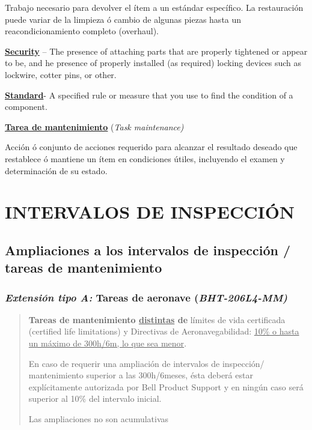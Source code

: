 \documentclass[
]{article}
\begin{document}
Trabajo necesario para devolver el ítem a un estándar específico. La
restauración puede variar de la limpieza ó cambio de algunas piezas
hasta un reacondicionamiento completo (overhaul).

\textbf{\ul{Security}} -- The presence of attaching parts that are
properly tightened or appear to be, and he presence of properly
installed (as required) locking devices such as lockwire, cotter pins,
or other.

\textbf{\ul{Standard}}- A specified rule or measure that you use to find
the condition of a component.

\textbf{\ul{Tarea de mantenimiento}} (\emph{Task maintenance)}

Acción ó conjunto de acciones requerido para alcanzar el resultado
deseado que restablece ó mantiene un ítem en condiciones útiles,
incluyendo el examen y determinación de su estado.
\newpage

\hypertarget{intervalos-de-inspecciuxf3n}{%
\section{\texorpdfstring{INTERVALOS DE INSPECCIÓN
}{INTERVALOS DE INSPECCIÓN }}\label{intervalos-de-inspecciuxf3n}}

\hypertarget{ampliaciones-a-los-intervalos-de-inspecciuxf3n-tareas-de-mantenimiento}{%
\subsection{Ampliaciones a los intervalos de inspección / tareas de
mantenimiento}\label{ampliaciones-a-los-intervalos-de-inspecciuxf3n-tareas-de-mantenimiento}}

\hypertarget{extensiuxf3n-tipo-a-tareas-de-aeronave-bht-206l4-mm}{%
\subsubsection{\texorpdfstring{\emph{Extensión tipo A:} Tareas de
aeronave (\emph{BHT-206L4-MM)}
}{Extensión tipo A: Tareas de aeronave (BHT-206L4-MM) }}\label{extensiuxf3n-tipo-a-tareas-de-aeronave-bht-206l4-mm}}

\begin{quote}
\textbf{Tareas de mantenimiento \ul{distintas} de} límites de vida
certificada (certified life limitations) y Directivas de
Aeronavegabilidad: \ul{10\% o hasta un máximo de 300h/6m, lo que sea
menor}.

En caso de requerir una ampliación de intervalos de inspección/
mantenimiento superior a las 300h/6meses, ésta deberá estar
explícitamente autorizada por Bell Product Support y en ningún caso será
superior al 10\% del intervalo inicial.

Las ampliaciones no son acumulativas
\end{quote}
\end{document}
